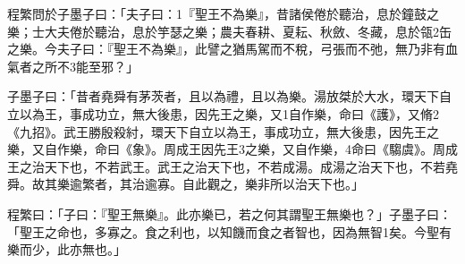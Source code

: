 
\begin{pinyinscope}
程繁問於子墨子曰：「夫子曰：1『聖王不為樂』，昔諸侯倦於聽治，息於鐘鼓之樂；士大夫倦於聽治，息於竽瑟之樂；農夫春耕、夏耘、秋斂、冬藏，息於瓴2缶之樂。今夫子曰：『聖王不為樂』，此譬之猶馬駕而不稅，弓張而不弛，無乃非有血氣者之所不3能至邪？」

子墨子曰：「昔者堯舜有茅茨者，且以為禮，且以為樂。湯放桀於大水，環天下自立以為王，事成功立，無大後患，因先王之樂，又1自作樂，命曰《護》，又脩2《九招》。武王勝殷殺紂，環天下自立以為王，事成功立，無大後患，因先王之樂，又自作樂，命曰《象》。周成王因先王3之樂，又自作樂，4命曰《騶虞》。周成王之治天下也，不若武王。武王之治天下也，不若成湯。成湯之治天下也，不若堯舜。故其樂逾繁者，其治逾寡。自此觀之，樂非所以治天下也。」

程繁曰：「子曰：『聖王無樂』。此亦樂已，若之何其謂聖王無樂也？」子墨子曰：「聖王之命也，多寡之。食之利也，以知饑而食之者智也，因為無智1矣。今聖有樂而少，此亦無也。」


\end{pinyinscope}